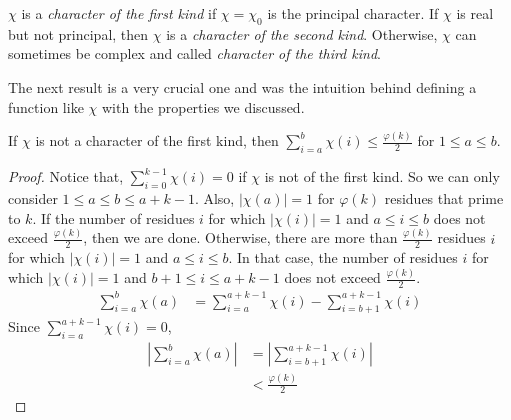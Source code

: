 \documentclass[elemannt.tex]{subfile}
\begin{document}
		\begin{definition}
			$\chi$ is a \textit{character of the first kind} if $\chi=\chi_{0}$ is the principal character. If $\chi$ is real but not principal, then $\chi$ is a \textit{character of the second kind}. Otherwise, $\chi$ can sometimes be complex and called \textit{character of the third kind}.
		\end{definition}
	The next result is a very crucial one and was the intuition behind defining a function like $\chi$ with the properties we discussed.
		\begin{proposition}\label{prop:sumphi/2}
			If $\chi$ is not a character of the first kind, then $\sum_{i=a}^{b}\chi(i)\leq \frac{\varphi(k)}{2}$ for $1\leq a\leq b$.
		\end{proposition}

		\begin{proof}
			Notice that, $\sum_{i=0}^{k-1}\chi(i)=0$ if $\chi$ is not of the first kind. So we can only consider $1\leq a\leq b\leq a+k-1$. Also, $|\chi(a)|=1$ for $\varphi(k)$ residues that prime to $k$. If the number of residues $i$ for which $|\chi(i)|=1$ and $a\leq i\leq b$ does not exceed $\frac{\varphi(k)}{2}$, then we are done. Otherwise, there are more than $\frac{\varphi(k)}{2}$ residues $i$ for which $|\chi(i)|=1$ and $a\leq i\leq b$. In that case, the number of residues $i$ for which $|\chi(i)|=1$ and $b+1\leq i\leq a+k-1$ does not exceed $\frac{\varphi(k)}{2}$.
				\begin{align*}
					\sum_{i=a}^{b}\chi(a)
						& = \sum_{i=a}^{a+k-1}\chi(i)-\sum_{i=b+1}^{a+k-1}\chi(i)
				\end{align*}
			Since $\sum_{i=a}^{a+k-1}\chi(i)=0$,
				\begin{align*}
					\left|\sum_{i=a}^{b}\chi(a)\right|
						& = \left|\sum_{i=b+1}^{a+k-1}\chi(i)\right|\\
						& < \frac{\varphi(k)}{2}
				\end{align*}
		\end{proof}
\end{document}

